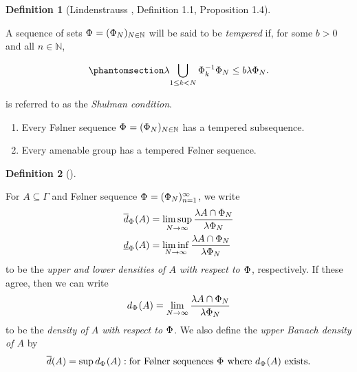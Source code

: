 \documentclass[
  british,
]{article}
\providecommand{\tightlist}{%
  \setlength{\itemsep}{0pt}\setlength{\parskip}{0pt}}
\theoremstyle{definition}
\newtheorem{definition}{Definition}[section]
\theoremstyle{plain}
\theoremstyle{plain}
\theoremstyle{remark}
\newcommand{\Folner}[1][\vphantom{}]{{\Phi}_{#1}}
\newcommand{\Density}[2][\Folner]{d_{{#1}}({#2})}
\newcommand{\UpperBanachDensity}[1]{\overline{d}({#1})}
\newcommand{\CountingMeasure}{{\lambda}}
\newcommand{\Group}{{\Gamma}}
\newcommand{\LowerDensity}[2][\Folner]{\underline{d}_{{#1}}({#2})}
\newcommand{\UpperDensity}[2][\Folner]{\overline{d}_{{#1}}({#2})}
\begin{document}
\begin{definition}[Lindenstrauss
, Definition 1.1,
Proposition
1.4]\protect\hypertarget{def-TemperedSequenceDef}{}\label{def-TemperedSequenceDef}

A sequence of sets \(\Folner=(\Folner[N])_{N\in\mathbb{N}}\) will be
said to be \emph{tempered} if, for some \(b>0\) and all
\(n\in\mathbb{N}\),

\begin{equation}\phantomsection\label{eq-ShulmanCondition}{
\CountingMeasure{\bigcup_{1\leq k<N}\Folner[k]^{-1}\Folner[N]}\leq b\CountingMeasure{\Folner[N]}.
}\end{equation}

is referred to as the \emph{Shulman condition}.

\begin{enumerate}
\def\labelenumi{\arabic{enumi}.}
\tightlist
\item
  Every Følner sequence \(\Folner=(\Folner[N])_{N\in\mathbb{N}}\) has a
  tempered subsequence.
\item
  Every amenable group has a tempered Følner sequence.
\end{enumerate}

\end{definition}

\begin{definition}[]\protect\hypertarget{def-DensityDef}{}\label{def-DensityDef}

For \(A\subseteq\Group\) and Følner sequence
\(\Folner=(\Folner[N])_{n=1}^\infty\), we write
\begin{align*}     \UpperDensity{A}&=\limsup_{N\rightarrow\infty}\frac{\CountingMeasure{A\cap\Folner[N]}}{\CountingMeasure{\Folner[N]}}     \\\LowerDensity{A}&=\liminf_{N\rightarrow\infty}\frac{\CountingMeasure{A\cap\Folner[N]}}{\CountingMeasure{\Folner[N]}} \end{align*}
to be the \emph{upper and lower densities of \(A\) with respect to
\(\Folner\)}, respectively. If these agree, then we can write \[
\Density{A}=\lim_{N\rightarrow\infty}\frac{\CountingMeasure{A\cap\Folner[N]}}{\CountingMeasure{\Folner[N]}}
\] to be the \emph{density of \(A\) with respect to \(\Folner\)}. We
also define the \emph{upper Banach density of \(A\)} by \[
\UpperBanachDensity{A}=\sup{d_{\Folner}(A):\text{for Følner sequences }\Folner\text{ where }d_{\Folner}(A)\text{ exists}}.
\]

\end{definition}
\end{document}
